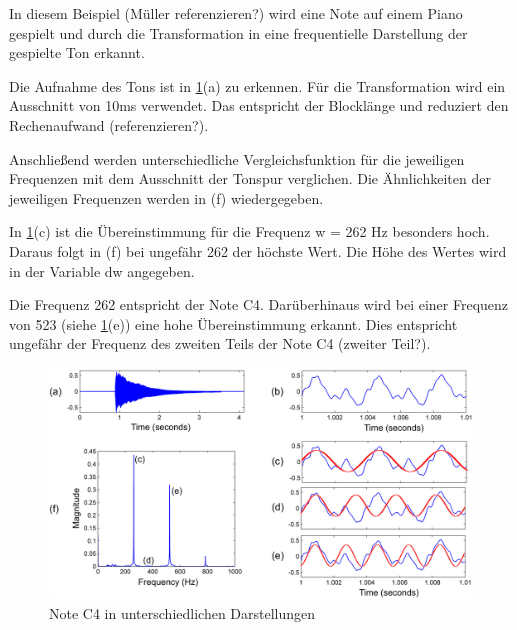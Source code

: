 In diesem Beispiel (Müller referenzieren?) wird eine Note auf einem Piano gespielt und durch die Transformation in eine frequentielle Darstellung der gespielte Ton erkannt.

\par

Die Aufnahme des Tons ist in \cref{fig:fourier}(a) zu erkennen. Für die Transformation wird ein Ausschnitt von 10ms verwendet. Das entspricht der Blocklänge und reduziert den Rechenaufwand (referenzieren?).

\par

Anschließend werden unterschiedliche Vergleichsfunktion für die jeweiligen Frequenzen mit dem Ausschnitt der Tonspur verglichen. Die Ähnlichkeiten der jeweiligen Frequenzen werden in (f) wiedergegeben.

\par

In \cref{fig:fourier}(c) ist die Übereinstimmung für die Frequenz w = 262 Hz besonders hoch. Daraus folgt in (f) bei ungefähr 262 der höchste Wert. Die Höhe des Wertes wird in der Variable dw angegeben.


\par

Die Frequenz 262 entspricht der Note C4. Darüberhinaus wird bei einer Frequenz von 523 (siehe \cref{fig:fourier}(e)) eine hohe Übereinstimmung erkannt. Dies entspricht ungefähr der Frequenz des zweiten Teils der Note C4 (zweiter Teil?).

%
\begin{figure}
\includegraphics[width=1\textwidth]{images/Fourier_math.PNG}
\caption{Note C4 in unterschiedlichen Darstellungen}
\label{fig:fourier}
\end{figure}
%

